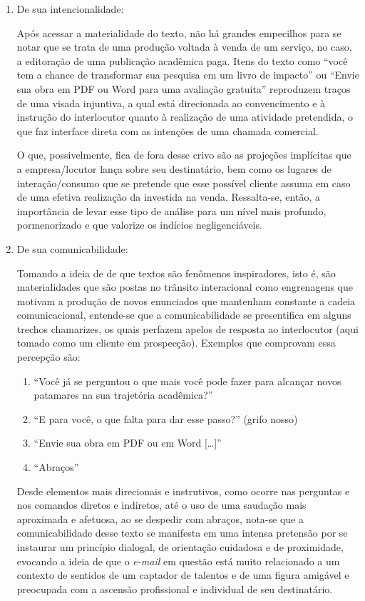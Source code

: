 \documentclass[portuguese]{textolivre}
\begin{document}
\begin{enumerate}
\item De sua intencionalidade:

Após acessar a materialidade do texto, não há grandes empecilhos para se notar que se trata de uma produção voltada à venda de um serviço, no caso, a editoração de uma publicação acadêmica paga. Itens do texto como “você tem a chance de transformar sua pesquisa em um livro de impacto” ou “Envie sua obra em PDF ou Word para uma avaliação gratuita” reproduzem traços de uma visada injuntiva, a qual está direcionada ao convencimento e à instrução do interlocutor quanto à realização de uma atividade pretendida, o que faz interface direta com as intenções de uma chamada comercial.

O que, possivelmente, fica de fora desse crivo são as projeções implícitas que a empresa/locutor lança sobre seu destinatário, bem como os lugares de interação/consumo que se pretende que esse possível cliente assuma em caso de uma efetiva realização da investida na venda. Ressalta-se, então, a importância de levar esse tipo de análise para um nível mais profundo, pormenorizado e que valorize os indícios negligenciáveis.

\item De sua comunicabilidade:

Tomando a ideia de \textcite{bentes2024texto} de que textos são fenômenos inspiradores, isto é, são materialidades que são postas no trânsito interacional como engrenagens que motivam a produção de novos enunciados que mantenham constante a cadeia comunicacional, entende-se que a comunicabilidade se presentifica em alguns trechos chamarizes, os quais perfazem apelos de resposta ao interlocutor (aqui tomado como um cliente em prospecção). Exemplos que comprovam essa percepção são:

\begin{enumerate}
    \item “Você já se perguntou o que mais você pode fazer para alcançar novos patamares na sua trajetória acadêmica?”
    \item  “E para você, o que falta para dar esse passo?” (grifo nosso)
    \item “Envie sua obra em PDF ou em Word […]”
    \item “Abraços”
\end{enumerate}

Desde elementos mais direcionais e instrutivos, como ocorre nas perguntas e nos comandos diretos e indiretos, até o uso de uma saudação mais aproximada e afetuosa, ao se despedir com abraços, nota-se que a comunicabilidade desse texto se manifesta em uma intensa pretensão por se instaurar um princípio dialogal, de orientação cuidadosa e de proximidade, evocando a ideia de que o \textit{e-mail} em questão está muito relacionado a um contexto de sentidos de um captador de talentos e de uma figura amigável e preocupada com a ascensão profissional e individual de seu destinatário.


\end{enumerate}
\end{document}
